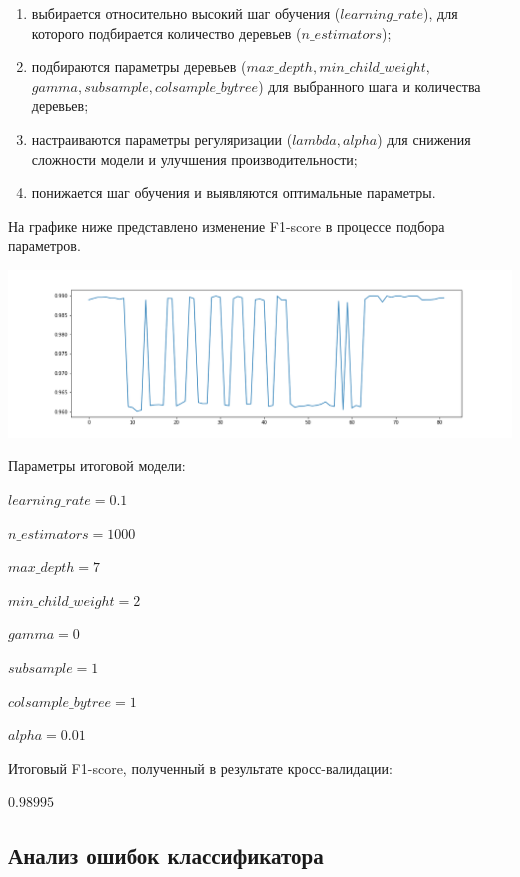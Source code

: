 \documentclass[a4paper,12pt]{article}
\begin{document}
\begin{enumerate}

	\item выбирается относительно высокий шаг обучения ($learning\_rate$), для которого подбирается количество деревьев ($n\_estimators$);
	\item подбираются параметры деревьев ($max\_depth, min\_child\_weight,$ $gamma, subsample, colsample\_bytree$) для выбранного шага и количества деревьев;
	\item настраиваются параметры регуляризации ($lambda, alpha$) для снижения сложности модели и улучшения производительности; 
	\item понижается шаг обучения и выявляются оптимальные параметры.

\end{enumerate}	

На графике ниже представлено изменение F1-score в процессе подбора параметров. 

\begin{center}
	\includegraphics[width=1.0\textwidth]{pics/parameters.png}
\end{center}

Параметры итоговой модели:

$learning\_rate = 0.1$

$n\_estimators = 1000$

$max\_depth = 7$

$min\_child\_weight = 2$

$gamma = 0$

$subsample = 1$

$colsample\_bytree = 1$

$alpha = 0.01$

Итоговый F1-score, полученный в результате кросс-валидации:

 $0.98995$

 \subsection{Анализ ошибок классификатора}
\end{document}
